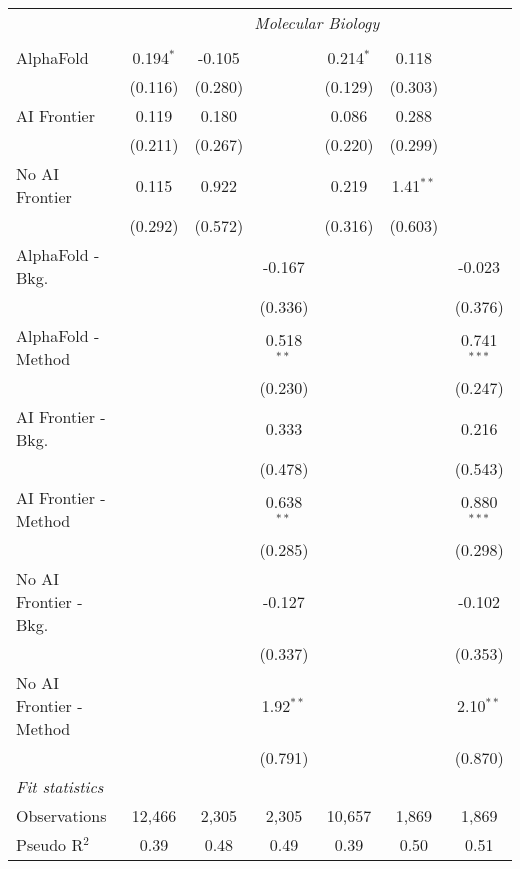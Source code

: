 \begin{tabular}{lcccccc}
 & \multicolumn{6}{c}{\textit{Molecular Biology}} \\ \\
   AlphaFold               & 0.194$^{*}$ & -0.105  &              & 0.214$^{*}$ & 0.118       &   \\   
                           & (0.116)     & (0.280) &              & (0.129)     & (0.303)     &   \\   
   AI Frontier             & 0.119       & 0.180   &              & 0.086       & 0.288       &   \\   
                           & (0.211)     & (0.267) &              & (0.220)     & (0.299)     &   \\   
   No AI Frontier          & 0.115       & 0.922   &              & 0.219       & 1.41$^{**}$ &   \\   
                           & (0.292)     & (0.572) &              & (0.316)     & (0.603)     &   \\   
   AlphaFold - Bkg.        &             &         & -0.167       &             &             & -0.023\\   
                           &             &         & (0.336)      &             &             & (0.376)\\   
   AlphaFold - Method      &             &         & 0.518$^{**}$ &             &             & 0.741$^{***}$\\   
                           &             &         & (0.230)      &             &             & (0.247)\\   
   AI Frontier - Bkg.      &             &         & 0.333        &             &             & 0.216\\   
                           &             &         & (0.478)      &             &             & (0.543)\\   
   AI Frontier - Method    &             &         & 0.638$^{**}$ &             &             & 0.880$^{***}$\\   
                           &             &         & (0.285)      &             &             & (0.298)\\   
   No AI Frontier - Bkg.   &             &         & -0.127       &             &             & -0.102\\   
                           &             &         & (0.337)      &             &             & (0.353)\\   
   No AI Frontier - Method &             &         & 1.92$^{**}$  &             &             & 2.10$^{**}$\\   
                           &             &         & (0.791)      &             &             & (0.870)\\   
   \midrule
   \emph{Fit statistics}\\
   Observations            & 12,466      & 2,305   & 2,305        & 10,657      & 1,869       & 1,869\\  
   Pseudo R$^2$            & 0.39        & 0.48    & 0.49         & 0.39        & 0.50        & 0.51\\  
   

\end{tabular}
